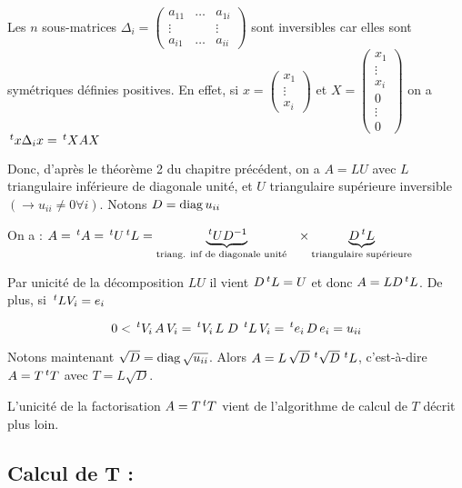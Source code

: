 \begin{preuve}
    Les $n$ sous-matrices 
$\Delta _i =
\begin{pmatrix}
    a_{11} & \dots & a_{1i} \\
    \vdots & & \vdots \\
    a_{i1} & \dots & a_{ii}
\end{pmatrix}$
sont inversibles car elles sont symétriques définies positives. En effet, si 
$x =
\begin{pmatrix}
    x_1 \\
    \vdots \\
    x_i
\end{pmatrix}
$
et
$X =
\begin{pmatrix}
    x_1 \\
    \vdots \\
    x_i \\
    0 \\
    \vdots \\
    0
\end{pmatrix}
$
on a $\,^tx \Delta_i x = \,^tXAX$

Donc, d'après le théorème 2 du chapitre précédent, on a $A = LU$ avec $L$ triangulaire
inférieure de diagonale unité, et $U$ triangulaire supérieure inversible $(\rightarrow u_{ii} \ne 0 \forall i)$.
Notons $D = \operatorname{diag}{u_{ii}}$

On a : $A = \,^tA = \,^tU \,^tL = \underbrace{\,^tU D^{-1}}_\text{triang. inf de diagonale unité \hspace{0.2cm}}
\times
\underbrace{D \,^tL}_\text{triangulaire supérieure}$

Par unicité de la décomposition $LU$ il vient $D\,^tL = U$ et donc $A = L D \,^tL$. De plus, si $\,^tL V_i = e_i$

\[
    0 < \,^tV_i \, A \, V_i = \,^tV_i \, L \; D \; \,^tL \, V_i = \,^te_i \, D \, e_i = u_{ii}
\]

Notons maintenant $\sqrt{D} = \operatorname{diag}{\sqrt{u_{ii}}}$. Alors $A = L \, \sqrt{D} \, \,^t\sqrt{D} \, \,^tL$,
c'est-à-dire $A = T \,^tT$ avec $T = L \sqrt{D}$.

L'unicité de la factorisation $A = T \,^tT$ vient de l'algorithme de calcul de $T$ décrit plus loin.
\end{preuve}


\subsection*{Calcul de T :}

